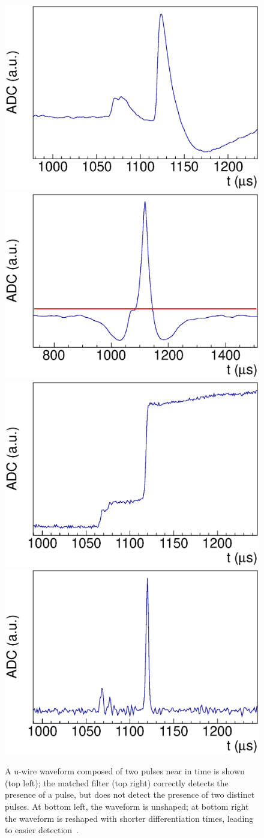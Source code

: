 \begin{figure}
\begin{center}
\includegraphics[keepaspectratio=true,width=.49\textwidth]{MSF_Raw.eps}
\includegraphics[keepaspectratio=true,width=.49\textwidth]{MSF_MatchedFilter.eps}
\includegraphics[keepaspectratio=true,width=.49\textwidth]{MSF_Unshaped.eps}
\includegraphics[keepaspectratio=true,width=.49\textwidth]{MSF_Reshaped.eps}
\end{center}
\renewcommand{\baselinestretch}{1}
\small\normalsize
\begin{quote}
\caption{A u-wire waveform composed of two pulses near in time is shown (top left); the matched filter (top right) correctly detects the presence of a pulse, but does not detect the presence of two distinct pulses.  At bottom left, the waveform is unshaped; at bottom right the waveform is reshaped with shorter differentiation times, leading to easier detection~\cite{ReconstructionDocument}.}
\label{fig:MultipleSignalFinderApplication}
\end{quote}
\end{figure}
\renewcommand{\baselinestretch}{2}
\small\normalsize

